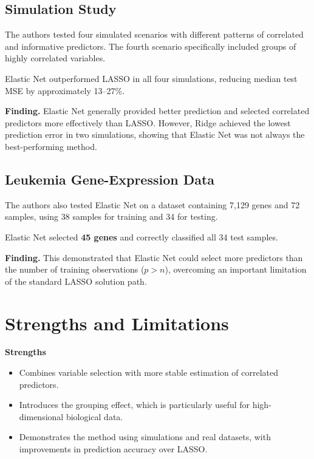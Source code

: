 \documentclass[
  letterpaper,
  DIV=11,
  numbers=noendperiod]{scrreprt}
\providecommand{\tightlist}{%
  \setlength{\itemsep}{0pt}\setlength{\parskip}{0pt}}
\begin{document}
\subsection{Simulation Study}\label{simulation-study}

The authors tested four simulated scenarios with different patterns of
correlated and informative predictors. The fourth scenario specifically
included groups of highly correlated variables.

Elastic Net outperformed LASSO in all four simulations, reducing median
test MSE by approximately 13--27\%.

\textbf{Finding.} Elastic Net generally provided better prediction and
selected correlated predictors more effectively than LASSO. However,
Ridge achieved the lowest prediction error in two simulations, showing
that Elastic Net was not always the best-performing method.

\subsection{Leukemia Gene-Expression
Data}\label{leukemia-gene-expression-data}

The authors also tested Elastic Net on a dataset containing 7,129 genes
and 72 samples, using 38 samples for training and 34 for testing.

Elastic Net selected \textbf{45 genes} and correctly classified all 34
test samples.

\textbf{Finding.} This demonstrated that Elastic Net could select more
predictors than the number of training observations (\(p > n\)),
overcoming an important limitation of the standard LASSO solution path.

\section{Strengths and Limitations}\label{strengths-and-limitations}

\textbf{Strengths}

\begin{itemize}
\tightlist
\item
  Combines variable selection with more stable estimation of correlated
  predictors.
\item
  Introduces the grouping effect, which is particularly useful for
  high-dimensional biological data.
\item
  Demonstrates the method using simulations and real datasets, with
  improvements in prediction accuracy over LASSO.
\end{itemize}
\end{document}
